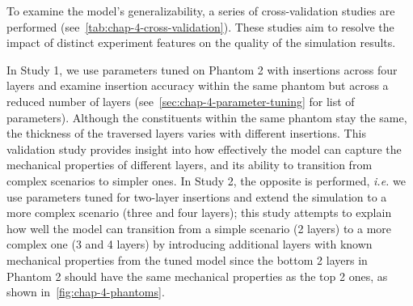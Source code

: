 \begin{table}[h]
  \centering
\caption{Summary of needle insertion experiments.}
\label{tab:chap-4-layers}
\end{table}

To examine the model's generalizability, a series of cross-validation studies are performed (see~\cref{tab:chap-4-cross-validation}). These studies aim to resolve the impact of distinct experiment features on the quality of the simulation results.

In Study 1, we use parameters tuned on Phantom 2 with insertions across four layers and examine insertion accuracy within the same phantom but across a reduced number of layers (see~\cref{sec:chap-4-parameter-tuning} for list of parameters). Although the constituents within the same phantom stay the same, the thickness of the traversed layers varies with different insertions. This validation study provides insight into how effectively the model can capture the mechanical properties of different layers, and its ability to transition from complex scenarios to simpler ones. In Study 2, the opposite is performed, \textit{i.e.} we use parameters tuned for two-layer insertions and extend the simulation to a more complex scenario (three and four layers); this study attempts to explain how well the model can transition from a simple scenario (2 layers) to a more complex one (3 and 4 layers) by introducing additional layers with known mechanical properties from the tuned model since the bottom 2 layers in Phantom 2 should have the same mechanical properties as the top 2 ones, as shown in~\cref{fig:chap-4-phantoms}.

